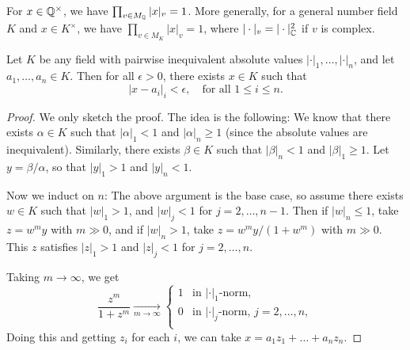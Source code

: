 \begin{theorem}
  For $x \in \mathbb{Q}^\times$, we have
  $\prod_{v \in M_{\mathbb{Q}}} |x|_v = 1$. More generally,
  for a general number field $K$ and $x \in K^\times$,
  we have $\prod_{v \in M_K} |x|_v = 1$, where
  $|\cdot|_v = |\cdot|_{\mathbb{C}}^2$ if $v$ is complex.
\end{theorem}

\begin{theorem}
  Let $K$ be any field with pairwise inequivalent
  absolute values $|\cdot|_1, \dots, |\cdot|_n$, and
  let $a_1, \dots, a_n \in K$. Then for all
  $\epsilon > 0$, there exists $x \in K$ such that
  \[
    |x - a_i|_{i} < \epsilon, \quad \text{for all $1 \le i \le n$}.
  \]
\end{theorem}

\begin{proof}
  We only sketch the proof. The idea is the following:
  We know that there exists $\alpha \in K$ such that
  $|\alpha|_1 < 1$ and $|\alpha|_n \ge 1$ (since
  the absolute values are inequivalent). Similarly,
  there exists $\beta \in K$ such that
  $|\beta|_n < 1$ and $|\beta|_1 \ge 1$. Let
  $y = \beta / \alpha$, so that
  $|y|_1 > 1$ and $|y|_n < 1$.

  Now we induct on $n$: The above argument is the base
  case, so assume there exists $w \in K$ such that
  $|w|_1 > 1$, and $|w|_j < 1$ for $j = 2, \dots, n - 1$.
  Then if $|w|_n \le 1$, take $z = w^m y$ with
  $m \gg 0$, and if $|w|_n > 1$, take $z = w^m y / (1 + w^m)$
  with $m \gg 0$. This $z$ satisfies
  $|z|_1 > 1$ and $|z|_j < 1$ for $j = 2, \dots, n$.

  Taking $m \to \infty$, we get
  \[
    \frac{z^m}{1 + z^m} \xrightarrow[m \to \infty]{}
    \begin{cases}
      1 & \text{in $|\cdot|_1$-norm}, \\
      0 & \text{in $|\cdot|_j$-norm, $j = 2, \dots, n$}, \\
    \end{cases}
  \]
  Doing this and getting $z_i$ for each $i$, we can take
  $x = a_1 z_1 + \dots + a_n z_n$.
\end{proof}
